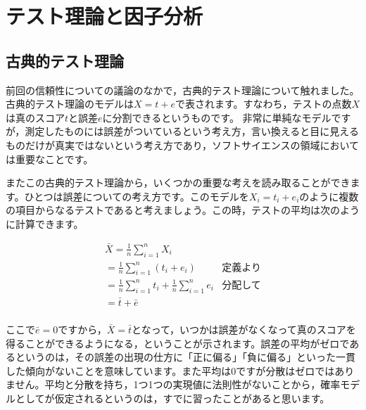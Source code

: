 \documentclass{ltjsbook}
\begin{document}
\chapter{テスト理論と因子分析}
\label{x03_testTheory}

\section{古典的テスト理論}
前回の信頼性についての議論のなかで，古典的テスト理論について触れました。古典的テスト理論のモデルは$X=t+e$で表されます。すなわち，テストの点数$X$は真のスコア$t$と誤差$e$に分割できるというものです。
非常に単純なモデルですが，測定したものには誤差がついているという考え方，言い換えると目に見えるものだけが真実ではないという考え方であり，ソフトサイエンスの領域においては重要なことです。

またこの古典的テスト理論から，いくつかの重要な考えを読み取ることができます。ひとつは誤差についての考え方です。このモデルを$X_i = t_i + e_i$のように複数の項目からなるテストであると考えましょう。この時，テストの平均は次のように計算できます。

\begin{align*}
     & \bar{X}  =  \frac{1}{n}\sum_{i=1}^n X_i                           &             & \mbox{} \\
     & =  \frac{1}{n}\sum_{i=1}^n (t_i + e_i)                            & \mbox{定義より}           \\
     & =  \frac{1}{n} \sum_{i=1}^n  t_i +  \frac{1}{n} \sum_{i=1}^n  e_i & \mbox{分配して}           \\
     & =  \bar{t} + \bar{e}                                              & \mbox{}               \\
\end{align*}

ここで$\bar{e}=0$ですから，$\bar{X}=\bar{t}$となって，いつかは誤差がなくなって真のスコアを得ることができるようになる，ということが示されます。誤差の平均がゼロであるというのは，その誤差の出現の仕方に「正に偏る」「負に偏る」といった一貫した傾向がないことを意味しています。また平均は$0$ですが分散はゼロではありません。平均と分散を持ち，1つ1つの実現値に法則性がないことから，確率モデルとしてが仮定されるというのは，すでに習ったことがあると思います。
\end{document}

